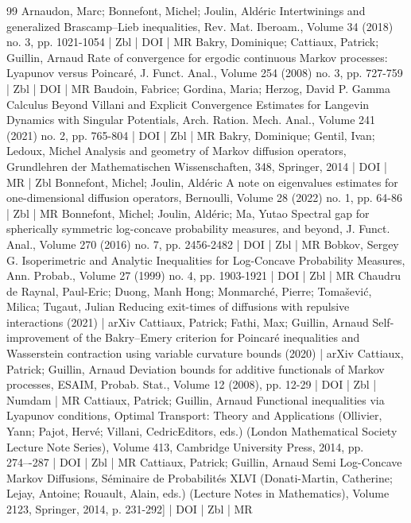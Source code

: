 \begin{thebibliography}{99}
 Arnaudon, Marc; Bonnefont, Michel; Joulin, Aldéric Intertwinings and generalized Brascamp–Lieb inequalities, Rev. Mat. Iberoam., Volume 34 (2018) no. 3, pp. 1021-1054 | Zbl | DOI | MR
 Bakry, Dominique; Cattiaux, Patrick; Guillin, Arnaud Rate of convergence for ergodic continuous Markov processes: Lyapunov versus Poincaré, J. Funct. Anal., Volume 254 (2008) no. 3, pp. 727-759 | Zbl | DOI | MR
 Baudoin, Fabrice; Gordina, Maria; Herzog, David P. Gamma Calculus Beyond Villani and Explicit Convergence Estimates for Langevin Dynamics with Singular Potentials, Arch. Ration. Mech. Anal., Volume 241 (2021) no. 2, pp. 765-804 | DOI | Zbl | MR
 Bakry, Dominique; Gentil, Ivan; Ledoux, Michel Analysis and geometry of Markov diffusion operators, Grundlehren der Mathematischen Wissenschaften, 348, Springer, 2014 | DOI | MR | Zbl
 Bonnefont, Michel; Joulin, Aldéric A note on eigenvalues estimates for one-dimensional diffusion operators, Bernoulli, Volume 28 (2022) no. 1, pp. 64-86 | Zbl | MR
 Bonnefont, Michel; Joulin, Aldéric; Ma, Yutao Spectral gap for spherically symmetric log-concave probability measures, and beyond, J. Funct. Anal., Volume 270 (2016) no. 7, pp. 2456-2482 | DOI | Zbl | MR
 Bobkov, Sergey G. Isoperimetric and Analytic Inequalities for Log-Concave Probability Measures, Ann. Probab., Volume 27 (1999) no. 4, pp. 1903-1921 | DOI | Zbl | MR
 Chaudru de Raynal, Paul-Eric; Duong, Manh Hong; Monmarché, Pierre; Tomašević, Milica; Tugaut, Julian Reducing exit-times of diffusions with repulsive interactions (2021) | arXiv
 Cattiaux, Patrick; Fathi, Max; Guillin, Arnaud Self-improvement of the Bakry–Emery criterion for Poincaré inequalities and Wasserstein contraction using variable curvature bounds (2020) | arXiv
 Cattiaux, Patrick; Guillin, Arnaud Deviation bounds for additive functionals of Markov processes, ESAIM, Probab. Stat., Volume 12 (2008), pp. 12-29 | DOI | Zbl | Numdam | MR
 Cattiaux, Patrick; Guillin, Arnaud Functional inequalities via Lyapunov conditions, Optimal Transport: Theory and Applications (Ollivier, Yann; Pajot, Hervé; Villani, CedricEditors, eds.) (London Mathematical Society Lecture Note Series), Volume 413, Cambridge University Press, 2014, pp. 274–-287 | DOI | Zbl | MR
 Cattiaux, Patrick; Guillin, Arnaud Semi Log-Concave Markov Diffusions, Séminaire de Probabilités XLVI (Donati-Martin, Catherine; Lejay, Antoine; Rouault, Alain, eds.) (Lecture Notes in Mathematics), Volume 2123, Springer, 2014, p. 231-292] | DOI | Zbl | MR

\end{thebibliography}
